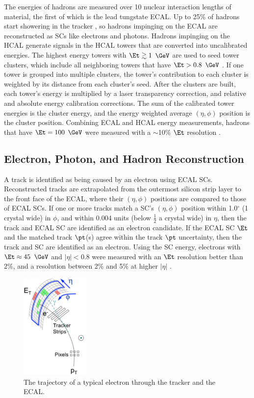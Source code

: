 The energies of hadrons are measured over 10 nuclear interaction lengths of material, the first of which is the lead tungstate ECAL.  
Up to 25\% of hadrons start showering in the tracker \cite{trackerPerformanceInCollisions}, so hadrons impinging on the ECAL are 
reconstructed as SCs like electrons and photons.  Hadrons impinging on the HCAL generate 
signals in the HCAL towers that are converted into uncalibrated energies.  The highest energy towers with $\Et \gtrsim 1$ $\GeV$ are 
used to seed tower clusters, which include all neighboring towers that have $\Et > 0.8$ $\GeV$ \cite{pflowEventReco}.  If one tower is 
grouped into multiple clusters, the tower's contribution to each cluster is weighted by its distance from each cluster's seed.  After 
the clusters are built, each tower's energy is multiplied by a laser transparency correction, and relative and absolute energy calibration 
corrections.  The sum of the calibrated tower energies is the cluster energy, and the energy weighted average $(\eta,\phi)$ position is 
the cluster position.  Combining ECAL and HCAL energy measurements, hadrons that have $\Et = 100$ $\GeV$ were measured with a $\sim$10\% 
$\Et$ resolution \cite{pflowEventReco}.

\subsection{Electron, Photon, and Hadron Reconstruction}
\label{sec:elePhoHadReco}
A track is identified as being caused by an electron using ECAL SCs.  Reconstructed tracks are extrapolated from the outermost silicon strip 
layer to the front face of the ECAL, where their $(\eta,\phi)$ positions are compared to those of ECAL SCs.  If one or more tracks match a SC's 
$(\eta,\phi)$ position within 1.0$^{\circ}$ (1 crystal wide) in $\phi$, and within 0.004 units (below $\frac{1}{2}$ a crystal wide) in $\eta$, then 
the track and ECAL SC are identified as an electron candidate.  If the ECAL SC $\Et$ and the matched track $\pt$(s) agree within the track 
$\pt$ uncertainty, then the track and SC are identified as an electron.  Using the SC energy, electrons with $\Et \approx 45$ $\GeV$ and 
$|\eta| < 0.8$ were measured with an $\Et$ resolution better than 2\%, and a resolution between 2\% and 5\% at higher $|\eta|$ 
\cite{ecalPerformanceInCollisions}.

\begin{figure}[h]
	\centering
	\includegraphics[width=0.3\textwidth]{figures/electronTrackAndSupercluster.png}
	\caption{The trajectory of a typical electron through the tracker and the ECAL.}
	\label{fig:eleTrackAndSC}
\end{figure}

